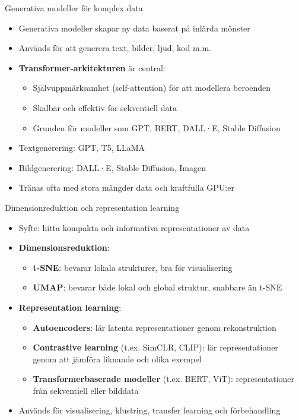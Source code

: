 \documentclass[10pt,english]{beamer}
\begin{document}
\begin{frame}{Generativa modeller för komplex data}
  \begin{itemize}
    \item Generativa modeller skapar ny data baserat på inlärda mönster
    \item Används för att generera text, bilder, ljud, kod m.m.
    \item \textbf{Transformer-arkitekturen} är central:
    \begin{itemize}
      \item Självuppmärksamhet (self-attention) för att modellera beroenden
      \item Skalbar och effektiv för sekventiell data
      \item Grunden för modeller som GPT, BERT, DALL·E, Stable Diffusion
    \end{itemize}
    \item Textgenerering: GPT, T5, LLaMA
    \item Bildgenerering: DALL·E, Stable Diffusion, Imagen
    \item Tränas ofta med stora mängder data och kraftfulla GPU:er
  \end{itemize}
\end{frame}

\begin{frame}{Dimensionreduktion och representation learning}
  \begin{itemize}
    \item Syfte: hitta kompakta och informativa representationer av data
    \item \textbf{Dimensionsreduktion}:
    \begin{itemize}
      \item \textbf{t-SNE}: bevarar lokala strukturer, bra för visualisering
      \item \textbf{UMAP}: bevarar både lokal och global struktur, snabbare än t-SNE
    \end{itemize}
    \item \textbf{Representation learning}:
    \begin{itemize}
      \item \textbf{Autoencoders}: lär latenta representationer genom rekonstruktion
      \item \textbf{Contrastive learning} (t.ex. SimCLR, CLIP): lär representationer genom att jämföra liknande och olika exempel
      \item \textbf{Transformerbaserade modeller} (t.ex. BERT, ViT): representationer från sekventiell eller bilddata
    \end{itemize}
    \item Används för visualisering, klustring, transfer learning och förbehandling
  \end{itemize}
\end{frame}
\end{document}
